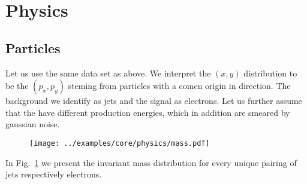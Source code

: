 
\section{Physics}

\subsection{Particles}
Let us use the same data set as above. We interpret the $(x,y)$
distribution to be the $(p_x,p_y)$ steming from particles with a comen
origin in direction. The background we identify as jets and the signal
as electrons. Let us further assume that the have different production
energies, which in addition are smeared by gaussian noise.
%
\begin{figure}
  \centering
  \texttt{[image: ../examples/core/physics/mass.pdf]}
  \caption{}
  \label{fig:example_physics}
\end{figure}
%
In Fig.~\ref{fig:example_physics} we present the invariant mass
distribution for every unique pairing of jets respectively electrons.

